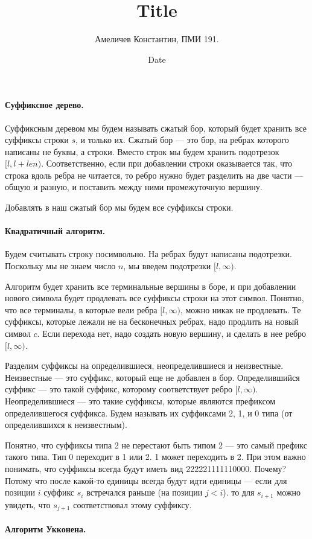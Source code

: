 \documentclass[12pt]{article}
\title{Title}
\author{Амеличев Константин, ПМИ 191.}
\date{Date}
\begin{document}
\paragraph{Суффиксное дерево.} Суффиксным деревом мы будем называть сжатый бор, который будет хранить все суффиксы строки $s$, и только их. Сжатый бор — это бор, на ребрах которого написаны не буквы, а строки. Вместо строк мы будем хранить подотрезок $[l, l + len)$. Соответственно, если при добавлении строки оказывается так, что строка вдоль ребра не читается, то ребро нужно будет разделить на две части — общую и разную, и поставить между ними  промежуточную вершину.

Добавлять в наш сжатый бор мы будем все суффиксы строки.


\paragraph{Квадратичный алгоритм.} Будем считывать строку посимвольно. На ребрах будут написаны подотрезки. Поскольку мы не знаем число $n$, мы введем подотрезки $[l, \infty)$.

Алгоритм будет хранить все терминальные вершины в боре, и при добавлении нового символа будет продлевать все суффиксы строки на этот символ. Понятно, что все терминалы, в которые вели ребра $[l, \infty)$, можно никак не продлевать. Те суффиксы, которые лежали не на бесконечных ребрах, надо продлить на новый символ $c$. Если перехода нет, надо создать новую вершину, и сделать в нее ребро $[l, \infty)$.

Разделим суффиксы на определившиеся, неопределившиеся и неизвестные. Неизвестные — это суффикс, который еще не добавлен в бор. Определившийся суффикс — это такой суффикс, которому соответствует ребро  $[l, \infty)$. Неопределившиеся — это такие суффиксы, которые являются префиксом определившегося суффикса. Будем называть их суффиксами 2, 1, и 0 типа (от определившихся к неизвестным).

Понятно, что суффиксы типа 2 не перестают быть типом 2 — это самый префикс такого типа. Тип 0 переходит в 1 или 2. 1 может переходить в 2. При этом важно понимать, что суффиксы всегда будут иметь вид 222221111110000. Почему? Потому что после какой-то единицы всегда будут идти единицы — если для позиции $i$ суффикс $s_i$ встречался раньше (на позиции $j < i$). то для $s_{i+1}$ можно увидеть, что $s_{j+1}$ соответствовал этому суффиксу.

\paragraph{Алгоритм Укконена.}
\end{document}
